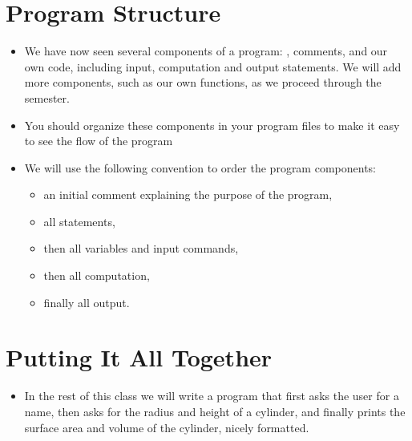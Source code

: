 \documentclass[letterpaper,10pt,english]{sphinxmanual}
\begin{document}
\section{Program Structure}
\label{\detokenize{lecture_notes/lec04_modules_functions1:program-structure}}\begin{itemize}
\item {} 
We have now seen several components of a program:
, comments, and our own code, including input,
computation and output statements.  We will add more components,
such as our own functions, as we proceed through the semester.

\item {} 
You should organize these components in your program files to make it
easy to see the flow of the program

\item {} 
We will use the following convention to order the program
components:
\begin{itemize}
\item {} 
an initial comment explaining the purpose of the program,

\item {} 
all  statements,

\item {} 
then all variables and input commands,

\item {} 
then all computation,

\item {} 
finally all output.

\end{itemize}

\end{itemize}


\section{Putting It All Together}
\label{\detokenize{lecture_notes/lec04_modules_functions1:putting-it-all-together}}\begin{itemize}
\item {} 
In the rest of this class we will write a program that first asks
the user for a name, then asks for the radius and height of a
cylinder, and finally prints the surface area and volume of the cylinder,
nicely formatted.

\end{itemize}
\end{document}
